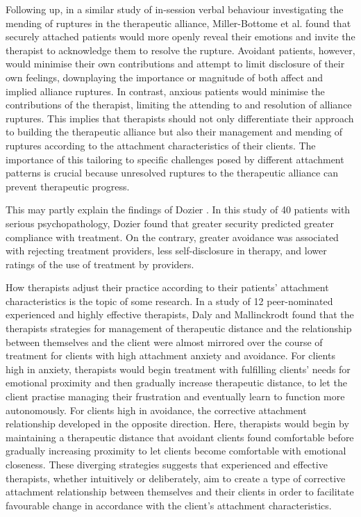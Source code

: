 \documentclass[12pt]{report}
\begin{document}
Following up, in a similar study of in-session verbal behaviour investigating the mending of ruptures in the therapeutic alliance, Miller-Bottome et al. \citeyear{MillerBottome2018} found that securely attached patients would more openly reveal their emotions and invite the therapist to acknowledge them to resolve the rupture.
Avoidant patients, however, would minimise their own contributions and attempt to limit disclosure of their own feelings, downplaying the importance or magnitude of both affect and implied alliance ruptures.
In contrast, anxious patients would minimise the contributions of the therapist, limiting the attending to and resolution of alliance ruptures.
This implies that therapists should not only differentiate their approach to building the therapeutic alliance but also their management and mending of ruptures according to the attachment characteristics of their clients. The importance of this tailoring to specific challenges posed by different attachment patterns is crucial because unresolved ruptures to the therapeutic alliance can prevent therapeutic progress.

This may partly explain the findings of Dozier \citeyear{Dozier1990}.
In this study of 40 patients with serious psychopathology, Dozier found that greater security predicted greater compliance with treatment.
On the contrary, greater avoidance was associated with rejecting treatment providers, less self-disclosure in therapy, and lower ratings of the use of treatment by providers.

How therapists adjust their practice according to their patients' attachment characteristics is the topic of some research.
In a study of 12 peer-nominated experienced and highly effective therapists, Daly and Mallinckrodt \citeyear{Daly2009} found that the therapists strategies for management of therapeutic distance and the relationship between themselves and the client were almost mirrored over the course of treatment for clients with high attachment anxiety and avoidance.
For clients high in anxiety, therapists would begin treatment with fulfilling clients' needs for emotional proximity and then gradually increase therapeutic distance, to let the client practise managing their frustration and eventually learn to function more autonomously.
For clients high in avoidance, the corrective attachment relationship developed in the opposite direction. Here, therapists would begin by maintaining a therapeutic distance that avoidant clients found comfortable before gradually increasing proximity to let clients become comfortable with emotional closeness.
These diverging strategies suggests that experienced and effective therapists, whether intuitively or deliberately, aim to create a type of corrective attachment relationship between themselves and their clients in order to facilitate favourable change in accordance with the client's attachment characteristics.
\end{document}
